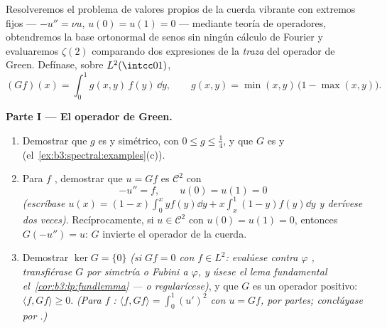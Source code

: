 \begin{problem}\label{pb:b3:spectral:1}
Resolveremos el problema de valores propios de la cuerda vibrante con
extremos fijos --- $-u'' = \nu u$, $u(0) = u(1) = 0$ --- mediante teoría
de operadores, obtendremos la base ortonormal de senos sin ningún
cálculo de Fourier y evaluaremos $\zeta(2)$ comparando dos expresiones
de la \emph{traza} del operador de Green. Defínase, sobre
$L^2(\intcc01)$,
\[
(Gf)(x) = \int_0^1 g(x,y)\,f(y)\,\dd y,
\qquad
g(x, y) = \min(x,y)\,\bigl(1 - \max(x,y)\bigr).
\]

\medskip
\noindent\textbf{Parte I --- El operador de Green.}
\begin{enumerate}
  \item Demostrar que $g$ es
   y simétrico, con
  $0 \leq g
        \leq \frac14$, y que $G$ es
   y
  (el~\cref{ex:b3:spectral:examples}(c)). \item Para $f$
  , demostrar que $u = Gf$
  es $\mathcal
        C^2$ con
        \[
        -u'' = f, \qquad u(0) = u(1) = 0
        \]
        \emph{(escríbase $u(x) = (1-x)\int_0^xyf(y)\dd y +
        x\int_x^1(1-y)f(y)\dd y$ y derívese dos veces)}. Recíprocamente,
        si $u \in \mathcal C^2$ con $u(0) = u(1)
        = 0$, entonces $G(-u'') = u$: $G$ invierte el operador de la
        cuerda. \item Demostrar $\ker G = \{0\}$ \emph{(si $Gf = 0$ con
        $f \in
        L^2$: evalúese contra $\varphi$
        , transfiérase $G$
        por simetría o Fubini a $\varphi$, y úsese el lema fundamental
        el~\cref{cor:b3:lp:fundlemma} --- o regularícese)}, y que $G$ es
        un operador positivo: $\langle f, Gf\rangle \geq 0$. \emph{(Para
        $f$ :
        $\langle f, Gf\rangle = \int_0^1 (u')^2$ con $u
        = Gf$, por partes; conclúyase por
        .)}
\end{enumerate}


\end{problem}
